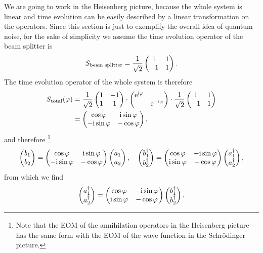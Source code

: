 \documentclass[hyperref, a4paper]{article}
\newcommand*{\ii}{\mathrm{i}}
\newcommand*{\ee}{\mathrm{e}}
\begin{document}
We are going to work in the Heisenberg picture,
because the whole system is linear 
and time evolution can be easily described by a linear transformation on the operators. 
Since this section is just to exemplify the overall idea of quantum noise,
for the sake of simplicity we assume the time evolution operator of the beam splitter is 
\begin{equation}
    S_{\text{beam splitter}} = \frac{1}{\sqrt{2}} \pmqty{ 1 & 1 \\ -1 & 1 } .
\end{equation}
The time evolution operator of the whole system is therefore
\begin{equation}
    \begin{aligned}
        S_\text{total}(\varphi) &= \frac{1}{\sqrt{2}} \pmqty{ 1 & -1 \\ 1 & 1 } \cdot \pmqty{\dmat{\ee^{\ii \varphi}, \ee^{- \ii \varphi}}} \cdot \frac{1}{\sqrt{2}} \pmqty{ 1 & 1 \\ -1 & 1 } \\
        &= \pmqty{ \cos \varphi & \ii \sin \varphi \\ - \ii \sin \varphi & - \cos \varphi },
    \end{aligned}
    \label{eq:total-matrix}
\end{equation} 
and therefore%
\footnote{
    Note that the EOM of the annihilation operators in the Heisenberg picture 
    has the same form with the EOM of the wave function in the Schr\={o}dinger picture.
} 
\begin{equation}
    \pmqty{b_1 \\ b_2} = \pmqty{ \cos \varphi & \ii \sin \varphi \\ - \ii \sin \varphi & - \cos \varphi } \pmqty{a_1 \\ a_2}, \quad 
    \pmqty{b_1^\dagger \\ b_2^\dagger} = \pmqty{ \cos \varphi & - \ii \sin \varphi \\ \ii \sin \varphi & - \cos \varphi } \pmqty{a_1^\dagger \\ a_2^\dagger},
    \label{eq:b-def-by-a}
\end{equation}
from which we find 
\begin{equation}
    \pmqty{a_1^\dagger \\ a_2^\dagger} = \pmqty{ \cos \varphi & - \ii \sin \varphi \\ \ii \sin \varphi & - \cos \varphi } \pmqty{b_1^\dagger \\ b_2^\dagger}.
\end{equation}
\end{document}
